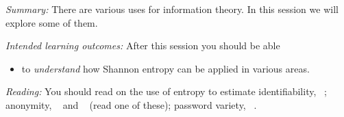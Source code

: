 \emph{Summary:}
There are various uses for information theory.
In this session we will explore some of them.

\emph{Intended learning outcomes:}
After this session you should be able
\begin{itemize}
  \item to \emph{understand} how Shannon entropy can be applied in various 
    areas.
\end{itemize}

\emph{Reading:}
You should read on the use of entropy to estimate identifiability,
~\cite{Eckersley2010hui};
anonymity, ~\cite{MeasuringAnonymity} and
~\cite{InfoTheoreticMetricForAnonymity} 
(read one of these);
password variety, ~\cite{Komanduri2011opa}.
